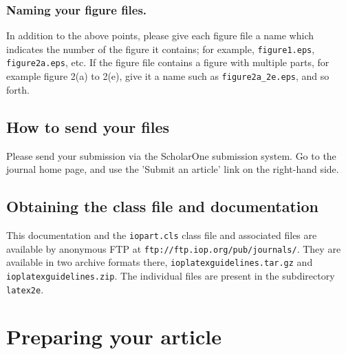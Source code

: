 \documentclass[12pt]{iopart}
\begin{document}
\subsubsection{\label{fname}Naming your figure files.} In addition to the above points, please give each figure file a name which indicates the number of the figure it contains; for example, \verb"figure1.eps", \verb"figure2a.eps", etc. If the figure file contains a figure with multiple parts, for example figure 2(a) to 2(e), give it a name such as \verb"figure2a_2e.eps", and so forth.
\subsection{How to send your files}
Please send your submission via the ScholarOne submission system.  Go to the journal home
page, and use the 'Submit an article' link on the right-hand side.

\subsection{Obtaining the class file and documentation}
This documentation and the \verb"iopart.cls" class file and associated files are available by anonymous FTP
at \verb"ftp://ftp.iop.org/pub/journals/".  They are available in two archive
formats there, \verb"ioplatexguidelines.tar.gz" and \verb"ioplatexguidelines.zip".  The individual files
are present in the subdirectory \verb"latex2e".

\section{Preparing your article}
\end{document}
